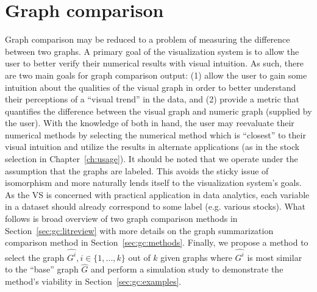 \chapter{Graph comparison \label{ch:gc}}

Graph comparison may be reduced to a problem of measuring the difference 
between two graphs. 
A primary goal of the visualization system is to allow the user to better 
verify their numerical results with visual intuition. As such, there are two 
main goals for graph comparison output: (1) allow the user to gain some 
intuition about the qualities of the visual graph in order to better understand 
their perceptions of a ``visual trend'' in the data, and (2) provide a metric 
that quantifies the difference between the visual graph and numeric graph 
(supplied by the user). With the knowledge of both in hand, the user may 
reevaluate their numerical methods by selecting the numerical method which is 
``closest'' to their visual intuition and utilize the results in alternate 
applications (as in the stock selection in Chapter~\ref{ch:usage}). 
It should be noted that we operate under 
the assumption that the graphs are labeled. This avoids the sticky issue of 
isomorphism and more naturally lends itself to the visualization system's 
goals. As the VS is concerned with practical application in data 
analytics, each variable in a dataset should already correspond to some label 
(e.g. various stocks).
What follows is broad overview of two graph comparison methods in 
Section~\ref{sec:gc:litreview} with more details on the graph summarization 
comparison method in Section~\ref{sec:gc:methods}. Finally, we propose a method 
to select the graph $\hat{G^i}, i \in \{1,...,k\}$ out of $k$ given graphs 
where $\hat{G^i}$ is most similar to the ``base'' graph $\hat{G}$ and perform 
a simulation study to demonstrate the method's viability in 
Section~\ref{sec:gc:examples}.



